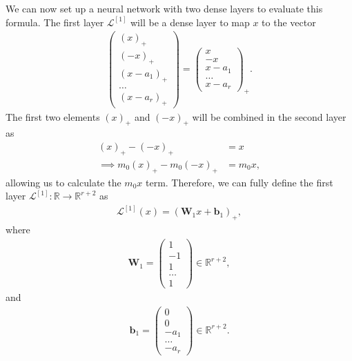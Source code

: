 \documentclass{somasmsc}
\begin{document}
We can now set up a neural network with two dense layers to evaluate this formula. The first layer $\mathcal{L}^{\left[1\right]}$ will be a dense layer to map $x$ to the vector
\begin{align*}
\begin{pmatrix}
    \left(x\right)_+ \\
    \left(-x\right)_+ \\
    \left(x - a_1\right)_+ \\
    \dots \\
    \left(x - a_r\right)_+
\end{pmatrix} =
\begin{pmatrix}
    x\ \\
    -x \\
    x - a_1 \\
    \dots \\
    x- a_r
\end{pmatrix}_+.
\end{align*}
The first two elements $\left(x\right)_+$ and $\left(-x\right)_+$ will be combined in the second layer as
\begin{align*}
\left(x\right)_+ - \left(-x\right)_+ &= x \\
\implies m_0 \left(x\right)_+ - m_0 \left(-x\right)_+ &= m_0 x,
\end{align*}
allowing us to calculate the $m_0 x$ term. Therefore, we can fully define the first layer $\mathcal{L}^{\left[1\right]}: \mathbb{R} \rightarrow \mathbb{R}^{r+2}$ as
\begin{align*}
\mathcal{L}^{\left[1\right]}\left(x\right) = \left(\mathbf{W}_1 x + \pmb{b}_1\right)_+,
\end{align*}
where
\begin{align*}
\mathbf{W}_1 =
\begin{pmatrix}
    1 \\
    -1 \\
    1 \\
    \dots \\
    1
\end{pmatrix} \in \mathbb{R}^{r+2},
\end{align*}
and
\begin{align*}
\pmb{b}_1 =
\begin{pmatrix}
    0 \\
    0 \\
    -a_1 \\
    \dots \\
    -a_r
\end{pmatrix} \in \mathbb{R}^{r+2}.
\end{align*}
\end{document}
